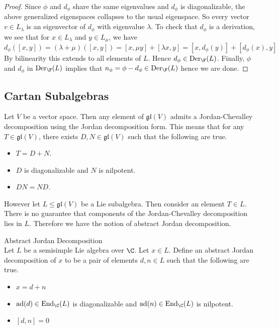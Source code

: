 \documentclass[a4paper]{article}
\begin{document}
\begin{lmm}{}{}
\begin{proof}
Since $\phi$ and $d_\phi$ share the same eigenvalues and $d_\phi$ is diagonalizable, the above generalized eigenspaces collapses to the usual eigenspace. So every vector $v\in L_\lambda$ is an eigenvector of $d_\phi$ with eigenvalue $\lambda$. To check that $d_\phi$ is a derivation, we see that for $x\in L_\lambda$ and $y\in L_\mu$, we have $$d_\phi([x,y])=(\lambda+\mu)([x,y])=[x,\mu y]+[\lambda x,y]=[x,d_\phi(y)]+[d_\phi(x),y]$$ By bilinearity this extends to all elements of $L$. Hence $d_\phi\in\text{Der}_\F(L)$. Finally, $\phi$ and $d_\phi$ in $\text{Der}_\F(L)$ implies that $n_\phi=\phi-d_\phi\in\text{Der}_\F(L)$ hence we are done. 
\end{proof}
\end{lmm}

\subsection{Cartan Subalgebras}
Let $V$ be a vector space. Then any element of $\mathfrak{gl}(V)$ admits a Jordan-Chevalley decomposition using the Jordan decomposition form. This means that for any $T\in\mathfrak{gl}(V)$, there exists $D,N\in\mathfrak{gl}(V)$ such that the following are true. 
\begin{itemize}
\item $T=D+N$. 
\item $D$ is diagonalizable and $N$ is nilpotent. 
\item $DN=ND$. 
\end{itemize}

However let $L\leq\mathfrak{gl}(V)$ be a Lie subalgebra. Then consider an element $T\in L$. There is no guarantee that components of the Jordan-Chevalley decomposition lies in $L$. Therefore we have the notion of abstract Jordan decomposition. 

\begin{defn}{Abstract Jordan Decomposition}{} \\Let $L$ be a semisimple Lie algebra over $\C$. Let $x\in L$. Define an abstract Jordan decomposition of $x$ to be a pair of elements $d,n\in L$ such that the following are true. 
\begin{itemize}
\item $x=d+n$
\item $\text{ad}(d)\in\text{End}_\C(L)$ is diagonalizable and $\text{ad}(n)\in\text{End}_\C(L)$ is nilpotent. 
\item $[d,n]=0$
\end{itemize}
\end{defn}
\end{document}
